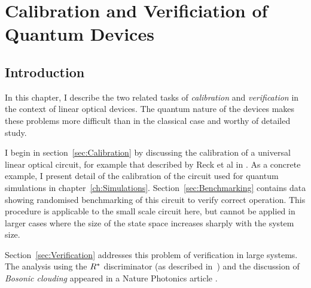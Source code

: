 \chapter{Calibration and Verificiation of Quantum Devices}
\label{ch:QCV}

\section{Introduction}
\label{sec:QCVIntro}
In this chapter, I describe the two related tasks of \emph{calibration} and
\emph{verification} in the context of linear optical devices. The
quantum nature of the devices makes these problems more difficult than in the
classical case and worthy of detailed study.

I begin in section~\ref{sec:Calibration} by discussing the calibration of a
universal linear optical circuit, for example that described by Reck et al in
\cite{reck}. As a concrete example, I present detail of the calibration of the
circuit used for quantum simulations in chapter~\ref{ch:Simulations}.
Section~\ref{sec:Benchmarking} contains data showing randomised benchmarking of
this circuit to verify correct operation. This procedure is applicable to the
small scale circuit here, but cannot be applied in larger cases where the size
of the state space increases sharply with the system size.

Section~\ref{sec:Verification} addresses this problem of verification in large
systems. The analysis using the \(R^{*}\) discriminator (as described
in~\cite{notuniform}) and the discussion of \emph{Bosonic clouding} appeared in
a Nature Photonics article \cite{verification}.

